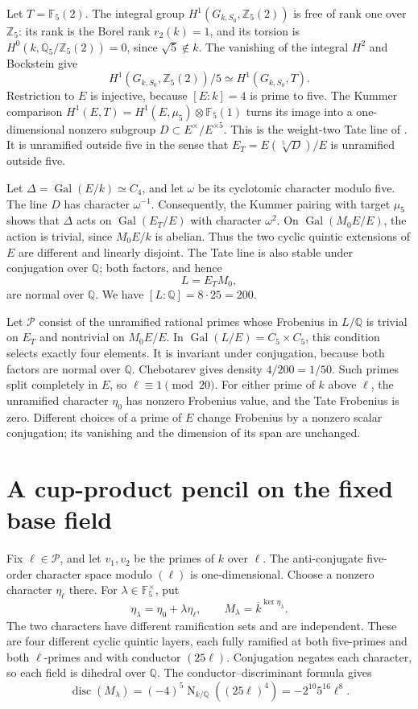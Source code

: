 \documentclass[11pt]{article}
\theoremstyle{remark}\newtheorem{remark}[theorem]{Remark}
\newcommand{\Q}{\mathbb Q}\newcommand{\Z}{\mathbb Z}
\newcommand{\F}{\mathbb F}\newcommand{\Gal}{\operatorname{Gal}}
\newcommand{\N}{\operatorname{N}}
\begin{document}
Let \(T=\F_5(2)\). The integral group
\(H^1(G_{k,S_0},\Z_5(2))\) is free of rank one over \(\Z_5\): its rank is
the Borel rank \(r_2(k)=1\), and its torsion is
\(H^0(k,\Q_5/\Z_5(2))=0\), since \(\sqrt5\notin k\).
The vanishing of the integral \(H^2\) and Bockstein give
\[
 H^1(G_{k,S_0},\Z_5(2))/5\simeq H^1(G_{k,S_0},T).
\]
Restriction to \(E\) is injective, because \([E:k]=4\) is prime to five.
The Kummer comparison
\(H^1(E,T)=H^1(E,\mu_5)\otimes\F_5(1)\) turns its image into a
one-dimensional nonzero subgroup \(D\subset E^\times/E^{\times5}\).
This is the weight-two Tate line of \cite{AM19}. It is unramified outside five
in the sense that \(E_T=E(\sqrt[5]{D})/E\) is unramified outside five.

Let \(\Delta=\Gal(E/k)\simeq C_4\), and let \(\omega\) be its cyclotomic
character modulo five. The line \(D\) has character \(\omega^{-1}\).
Consequently, the Kummer pairing with target \(\mu_5\) shows that
\(\Delta\) acts on \(\Gal(E_T/E)\) with character \(\omega^2\).
On \(\Gal(M_0E/E)\), the action is trivial, since \(M_0E/k\) is abelian.
Thus the two cyclic quintic extensions of \(E\) are different and linearly
disjoint. The Tate line is also stable under conjugation over \(\Q\);
both factors, and hence
\[
 L=E_T M_0,
\]
are normal over \(\Q\). We have \([L:\Q]=8\cdot25=200\).

Let \(\mathcal P\) consist of the unramified rational primes whose Frobenius
in \(L/\Q\) is trivial on \(E_T\) and nontrivial on \(M_0E/E\).
In \(\Gal(L/E)=C_5\times C_5\), this condition selects exactly four elements.
It is invariant under conjugation, because both factors are normal over
\(\Q\). Chebotarev gives density \(4/200=1/50\).
Such primes split completely in \(E\), so \(\ell\equiv1\pmod{20}\).
For either prime of \(k\) above \(\ell\), the unramified character
\(\eta_0\) has nonzero Frobenius value, and the Tate Frobenius is zero.
Different choices of a prime of \(E\) change Frobenius by a nonzero scalar
conjugation; its vanishing and the dimension of its span are unchanged.

\section{A cup-product pencil on the fixed base field}
Fix \(\ell\in\mathcal P\), and let \(v_1,v_2\) be the primes of \(k\) over
\(\ell\). The anti-conjugate five-order character space modulo \((\ell)\)
is one-dimensional. Choose a nonzero character \(\eta_\ell\) there.
For \(\lambda\in\F_5^\times\), put
\[
 \eta_\lambda=\eta_0+\lambda\eta_\ell,
 \qquad M_\lambda=\overline{k}^{\ker\eta_\lambda}.
\]
The two characters have different ramification sets and are independent.
These are four different cyclic quintic layers, each fully ramified at both
five-primes and both \(\ell\)-primes and with conductor \((25\ell)\).
Conjugation negates each character, so each field is dihedral over \(\Q\).
The conductor--discriminant formula gives
\[
 \operatorname{disc}(M_\lambda)
 =(-4)^5\N_{k/\Q}((25\ell)^4)
 =-2^{10}5^{16}\ell^8.
\]
\end{document}
